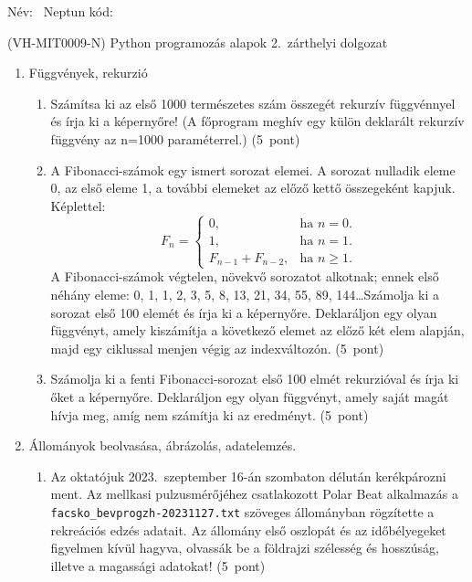 \documentclass[a4paper,12pt]{letter}
\begin{document}

Név: \hrulefill\ Neptun kód: \hrulefill

\begin{center}
 (VH-MIT0009-N) Python programozás alapok  2.~zárthelyi dolgozat
 \end{center}

 \begin{enumerate}
 \item Függvények, rekurzió
   \begin{enumerate}
   \item Számítsa ki az első 1000 természetes szám összegét rekurzív függvénnyel és írja ki a képernyőre! (A főprogram meghív egy külön deklarált rekurzív függvény az n=1000 paraméterrel.) \hfill (5~pont)
   \item A Fibonacci-számok egy ismert sorozat elemei. A sorozat nulladik eleme 0, az első eleme 1, a további elemeket az előző kettő összegeként kapjuk. Képlettel:
     \begin{equation*}
     F_{n}=\begin{cases}
    0, & \text{ha $n=0$}.\\
    1, & \text{ha $n=1$}.\\
    F_{n-1}+F_{n-2}, & \text{ha $n\ge1$.}
  \end{cases}
\end{equation*}
A Fibonacci-számok végtelen, növekvő sorozatot alkotnak; ennek első néhány eleme: 0, 1, 1, 2, 3, 5, 8, 13, 21, 34, 55, 89, 144\dots Számolja ki a sorozat első 100 elemét és írja ki a képernyőre. Deklaráljon egy olyan függvényt, amely kiszámítja a következő elemet az előző két elem alapján, majd egy ciklussal menjen végig az indexváltozón. \hfill (5~pont)
\item Számolja ki a fenti Fibonacci-sorozat első 100 elmét rekurzióval és írja ki őket a képernyőre. Deklaráljon egy olyan függvényt, amely saját magát hívja meg, amíg nem számítja ki az eredményt. \hfill (5~pont)
   \end{enumerate}
 \item Állományok beolvasása, ábrázolás, adatelemzés.
\begin{enumerate}
\item Az oktatójuk 2023.~szeptember 16-án szombaton délután kerékpározni ment. Az mellkasi pulzusmérőjéhez csatlakozott Polar Beat alkalmazás a \texttt{facsko\_bevprogzh-20231127.txt} szö\-ve\-ges állományban rögzítette a rekreációs edzés adatait. Az állomány első oszlopát és az időbélyegeket figyelmen kívül hagyva, olvassák be a földrajzi szélesség és hosszúság, illetve a magassági adatokat! \hfill (5~pont)

\end{enumerate}
\end{enumerate}
\end{document}
